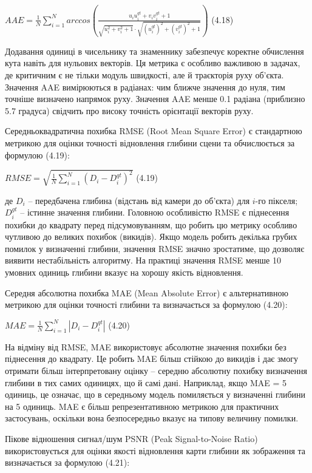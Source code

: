 \documentclass[
]{article}
\begin{document}
\(AAE = \frac{1}{N}\sum_{i = 1}^{N}{arccos\left( \frac{u_{i}u_{i}^{qt} + v_{i}v_{i}^{qt} + 1}{\sqrt{u_{i}^{2} + v_{i}^{2} + 1} \cdot \sqrt{\left( u_{i}^{qt} \right)^{2} + \left( v_{i}^{qt} \right)^{2} + 1}} \right)}\) (4.18)

Додавання одиниці в чисельнику та знаменнику забезпечує коректне обчислення кута навіть для нульових векторів. Ця метрика є особливо важливою в задачах, де критичним є не тільки модуль швидкості, але й траєкторія руху об'єкта. Значення AAE вимірюються в радіанах: чим ближче значення до нуля, тим точніше визначено напрямок руху. Значення AAE менше 0.1 радіана (приблизно 5.7 градуса) свідчить про високу точність орієнтації векторів руху.

Середньоквадратична похибка RMSE (Root Mean Square Error) є стандартною метрикою для оцінки точності відновлення глибини сцени та обчислюється за формулою (4.19):

\(RMSE = \sqrt{\frac{1}{N}\sum_{i = 1}^{N}\left( D_{i} - D_{i}^{qt} \right)^{2}}\) (4.19)

де \(D_{i}\) -- передбачена глибина (відстань від камери до об'єкта) для \(i\)-го пікселя; \(D_{i}^{gt}\) -- істинне значення глибини. Головною особливістю RMSE є піднесення похибки до квадрату перед підсумовуванням, що робить цю метрику особливо чутливою до великих похибок (викидів). Якщо модель робить декілька грубих помилок у визначенні глибини, значення RMSE значно зростатиме, що дозволяє виявити нестабільність алгоритму. На практиці значення RMSE менше 10 умовних одиниць глибини вказує на хорошу якість відновлення.

Середня абсолютна похибка MAE (Mean Absolute Error) є альтернативною метрикою для оцінки точності глибини та визначається за формулою (4.20):

\(MAE = \frac{1}{N}\sum_{i = 1}^{N}\left| D_{i} - D_{i}^{qt} \right|\) (4.20)

На відміну від RMSE, MAE використовує абсолютне значення похибки без піднесення до квадрату. Це робить MAE більш стійкою до викидів і дає змогу отримати більш інтерпретовану оцінку -- середню абсолютну похибку визначення глибини в тих самих одиницях, що й самі дані. Наприклад, якщо MAE = 5 одиниць, це означає, що в середньому модель помиляється у визначенні глибини на 5 одиниць. MAE є більш репрезентативною метрикою для практичних застосувань, оскільки вона безпосередньо вказує на типову величину помилки.

Пікове відношення сигнал/шум PSNR (Peak Signal-to-Noise Ratio) використовується для оцінки якості відновлення карти глибини як зображення та визначається за формулою (4.21):
\end{document}
